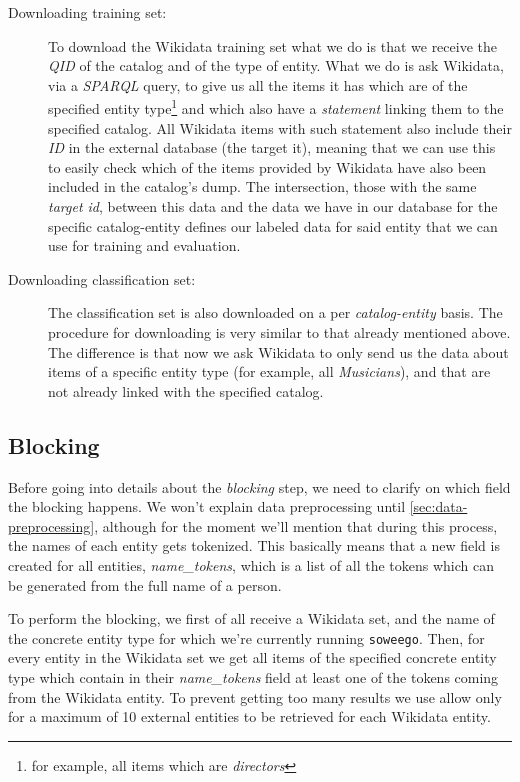 \documentclass[epsfig,a4paper,11pt,titlepage,twoside,openany]{book}
\begin{document}
\begin{description}
\item[Downloading training set:] To download the Wikidata training set what we do is that we receive the \textit{QID} of the catalog and of the type of entity. What we do is ask Wikidata, via a \textit{SPARQL} query, to give us all the items it has which are of the specified entity type\footnote{for example, all items which are \textit{directors}} and which also have a \textit{statement} linking them to the specified catalog. All Wikidata items with such statement also include their \textit{ID} in the external database (the target it), meaning that we can use this to easily check which of the items provided by Wikidata have also been included in the catalog's dump. The intersection, those with the same \textit{target id}, between this data and the data we have in our database for the specific catalog-entity defines our labeled data  for said entity that we can use for training and evaluation.
 
\item[Downloading classification set:] The classification set is also downloaded on a per \textit{catalog-entity} basis. The procedure for downloading is very similar to that already mentioned above. The difference is that now we ask Wikidata to only send us the data about items of a specific entity type (for example, all \textit{Musicians}), and that are not already linked with the specified catalog.
\end{description}



\subsection{Blocking}
\label{sec:soweego-st-blocking}

Before going into details about the \textit{blocking} step, we need to clarify on which field the blocking happens. We won't explain data preprocessing until \autoref{sec:data-preprocessing}, although for the moment we'll mention that during this process, the names of each entity gets tokenized. This basically means that a new field is created for all entities, \textit{name\_tokens}, which is a list of all the tokens which can be generated from the full name of a person.

To perform the blocking, we first of all receive a Wikidata set, and the name of the concrete entity type for which we're currently running \texttt{soweego}. Then, for every entity in the Wikidata set we get all items of the specified concrete entity type which contain in their \textit{name\_tokens} field at least one of the tokens coming from the Wikidata entity. To prevent getting too many results we use allow only for a maximum of 10 external entities to be retrieved for each Wikidata entity.
\end{document}
